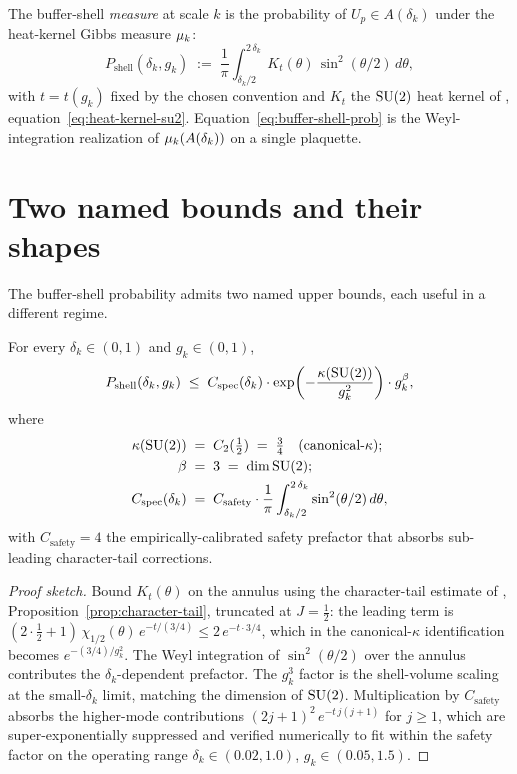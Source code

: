 The buffer-shell \emph{measure} at scale $k$ is the probability of
$U_p \in A(\delta_k)$ under the heat-kernel Gibbs measure $\mu_k$:
\begin{equation}
  \label{eq:buffer-shell-prob}
  P_{\mathrm{shell}}(\delta_k, g_k)
  \;:=\;
  \frac{1}{\pi}
  \int_{\delta_k / 2}^{2\,\delta_k}
    K_t(\theta)\, \sin^2(\theta/2)\, d\theta ,
\end{equation}
with $t = t(g_k)$ fixed by the chosen convention and $K_t$ the
$\mathrm{SU}(2)$ heat kernel of , equation~\eqref{eq:heat-kernel-su2}.
Equation~\eqref{eq:buffer-shell-prob} is the Weyl-integration
realization of $\mu_k(A(\delta_k))$ on a single plaquette.

\section{Two named bounds and their shapes}
\label{sec:buffer-bounds}

The buffer-shell probability admits two named upper bounds, each
useful in a different regime.

%

\begin{theorem}
\label{thm:buffer-spec-shape}
For every $\delta_k \in (0, 1)$ and $g_k \in (0, 1)$,
\begin{equation}
  \label{eq:buffer-spec-shape}
  P_{\mathrm{shell}}(\delta_k, g_k)
  \;\le\;
  C_{\mathrm{spec}}(\delta_k) \cdot \exp\!\left(-\frac{\kappa(\mathrm{SU}(2))}{g_k^2}\right) \cdot g_k^{\beta},
\end{equation}
where
\begin{align}
  \label{eq:spec-shape-data}
  \kappa(\mathrm{SU}(2)) &\;=\; C_2(\tfrac12) \;=\; \tfrac34
    \quad \text{(canonical-$\kappa$);}\\
  \beta &\;=\; 3 \;=\; \dim \mathrm{SU}(2);\\
  C_{\mathrm{spec}}(\delta_k) &\;=\; C_{\mathrm{safety}} \cdot
    \frac{1}{\pi}\int_{\delta_k/2}^{2\,\delta_k} \sin^2(\theta/2)\, d\theta,
\end{align}
with $C_{\mathrm{safety}} = 4$ the empirically-calibrated safety
prefactor that absorbs sub-leading character-tail corrections.
\end{theorem}

\begin{proof}[Proof sketch]
Bound $K_t(\theta)$ on the annulus using the character-tail estimate
of , Proposition~\ref{prop:character-tail},
truncated at $J = \tfrac12$: the leading term is $(2 \cdot \tfrac12 +
1)\,\chi_{1/2}(\theta)\, e^{-t/(3/4)} \le 2\, e^{-t \cdot 3/4}$,
which in the canonical-$\kappa$ identification becomes
$e^{-(3/4)/g_k^2}$.  The Weyl integration of $\sin^2(\theta/2)$ over
the annulus contributes the $\delta_k$-dependent prefactor.  The
$g_k^3$ factor is the shell-volume scaling at the small-$\delta_k$
limit, matching the dimension of $\mathrm{SU}(2)$.  Multiplication by
$C_{\mathrm{safety}}$ absorbs the higher-mode contributions
$(2j+1)^2\,e^{-t\,j(j+1)}$ for $j \ge 1$, which are super-exponentially
suppressed and verified numerically to fit within the safety factor
on the operating range $\delta_k \in (0.02, 1.0)$, $g_k \in (0.05, 1.5)$.
\end{proof}

